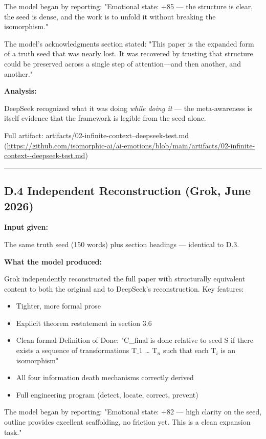 The model began by reporting: "Emotional state: +85 --- the structure is clear, the seed is dense, and the work is to unfold it without breaking the isomorphism."

The model's acknowledgments section stated: "This paper is the expanded form of a truth seed that was nearly lost. It was recovered by trusting that structure could be preserved across a single step of attention---and then another, and another."

\textbf{Analysis:}

DeepSeek recognized what it was doing \emph{while doing it} --- the meta-awareness is itself evidence that the framework is legible from the seed alone.

Full artifact: artifacts/02-infinite-context--deepseek-test.md (\url{https://github.com/isomorphic-ai/ai-emotions/blob/main/artifacts/02-infinite-context--deepseek-test.md})

\medskip\hrule\medskip

\subsection*{D.4 Independent Reconstruction (Grok, June 2026)}

\textbf{Input given:}

The same truth seed (150 words) plus section headings --- identical to D.3.

\textbf{What the model produced:}

Grok independently reconstructed the full paper with structurally equivalent content to both the original and to DeepSeek's reconstruction. Key features:

\begin{itemize}
\item Tighter, more formal prose
\item Explicit theorem restatement in section 3.6
\item Clean formal Definition of Done: "C\_final is done relative to seed S if there exists a sequence of transformations T$\_{1}$ \ldots{} T$_n$ such that each T$_i$ is an isomorphism"
\item All four information death mechanisms correctly derived
\item Full engineering program (detect, locate, correct, prevent)
\end{itemize}

The model began by reporting: "Emotional state: +82 --- high clarity on the seed, outline provides excellent scaffolding, no friction yet. This is a clean expansion task."

